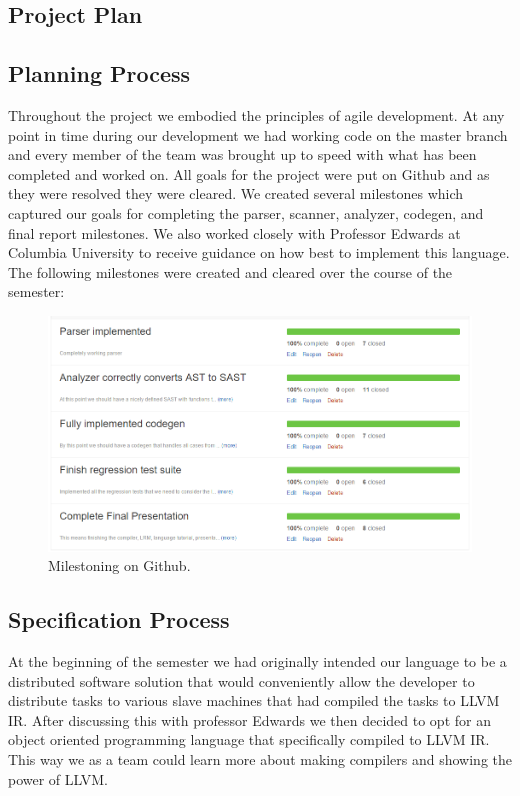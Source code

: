 \begin{homeworkProblem}
	\chapter{Project Plan}
	\section{Planning Process}
	Throughout the project we embodied the principles of agile development. At any point in time during our development we had working code on the master branch and every member of the team was brought up to speed with what has been completed and worked on. All goals for the project were put on Github and as they were resolved they were cleared. We created several milestones which captured our goals for completing the parser, scanner, analyzer, codegen, and final report milestones. We also  worked closely with Professor Edwards at Columbia University to receive guidance on how best to implement this language. 
	The following milestones were created and cleared over the course of the semester:
	\begin{figure}[!ht]
		\centering
		\includegraphics[width=4.5in]{Includes/milestones}
		\caption{Milestoning on Github.}
	\end{figure}
	
	\section{Specification Process}
	At the beginning of the semester we had originally intended our language to be a distributed software solution that would conveniently allow the developer to distribute tasks to various slave machines that had compiled the tasks to LLVM IR. After discussing this with professor Edwards we then decided to opt for an object oriented programming language that specifically compiled to LLVM IR. This way we as a team could learn more about making compilers and showing the power of LLVM. 
	

\end{homeworkProblem}
